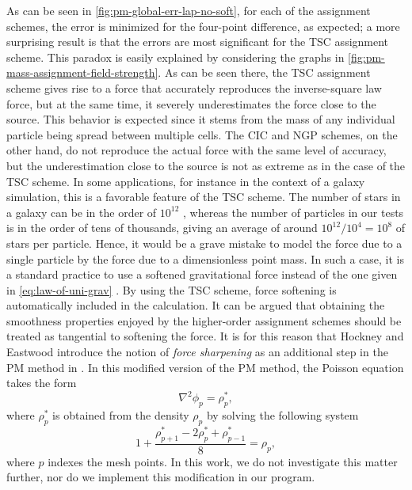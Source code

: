 As can be seen in \autoref{fig:pm-global-err-lap-no-soft}, for each of the assignment schemes, the error is minimized for the four-point difference, as expected;
a more surprising result is that the errors are most significant for the TSC assignment scheme.
This paradox is easily explained by considering the graphs in \autoref{fig:pm-mass-assignment-field-strength}.
As can be seen there, the TSC assignment scheme gives rise to a force that accurately reproduces the inverse-square law force, but at the same time, it severely underestimates the force close to the source.
This behavior is expected since it stems from the mass of any individual particle being spread between multiple cells.
The CIC and NGP schemes, on the other hand, do not reproduce the actual force with the same level of accuracy, but the underestimation close to the source is not as extreme as in the case of the TSC scheme.
In some applications, for instance in the context of a galaxy simulation, this is a favorable feature of the TSC scheme.
The number of stars in a galaxy can be in the order of $10^{12}$ \cite{young2006andromeda}, whereas the number of particles in our tests is in the order of tens of thousands, giving an average of around $10^{12} / 10^{4} = 10^8$ of stars per particle.
Hence, it would be a grave mistake to model the force due to a single particle by the force due to a dimensionless point mass.
In such a case, it is a standard practice to use a softened gravitational force instead of the one given in \autoref{eq:law-of-uni-grav} \cite{10.1046/j.1365-8711.2000.03316.x}.
By using the TSC scheme, force softening is automatically included in the calculation.
It can be argued that obtaining the smoothness properties enjoyed by the higher-order assignment schemes should be treated as tangential to softening the force.
It is for this reason that Hockney and Eastwood introduce the notion of \textit{force sharpening} as an additional step in the PM method in \cite{Hockney1988}.
In this modified version of the PM method, the Poisson equation takes the form
\begin{equation*}
    \nabla^2 \phi_p = \rho_p^*,
\end{equation*}
where $\rho^*_p$ is obtained from the density $\rho_p$ by solving the following system
\begin{equation*}
    1+\frac{\rho^*_{p+1} - 2\rho^*_p + \rho^*_{p-1}}{8}
    = \rho_p,
\end{equation*}
where $p$ indexes the mesh points.
In this work, we do not investigate this matter further, nor do we implement this modification in our program.

